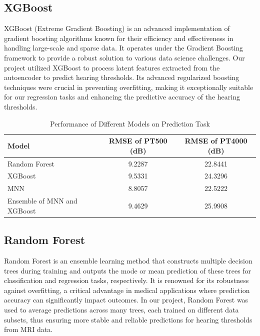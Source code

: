 \documentclass[conference,compsoc]{IEEEtran}
\begin{document}
\subsection{XGBoost} XGBoost (Extreme Gradient Boosting) is an advanced implementation of gradient boosting algorithms known for their efficiency and effectiveness in handling large-scale and sparse data. It operates under the Gradient Boosting framework to provide a robust solution to various data science challenges. Our project utilized XGBoost to process latent features extracted from the autoencoder to predict hearing thresholds. Its advanced regularized boosting techniques were crucial in preventing overfitting, making it exceptionally suitable for our regression tasks and enhancing the predictive accuracy of the hearing thresholds.

\begin{table}[ht]
	\centering
	\caption{Performance of Different Models on Prediction Task}
	\label{tab:model_performance}
	\begin{tabular}{|l|c|c|}
		\hline
		\textbf{Model}              & \textbf{RMSE of PT500 (dB)} & \textbf{RMSE of PT4000 (dB)} \\ \hline
		Random Forest               & 9.2287                      & 22.8441                      \\ \hline
		XGBoost                     & 9.5331                      & 24.3296                      \\ \hline
		MNN                         & 8.8057                      & 22.5222                      \\ \hline
		Ensemble of MNN and XGBoost & 9.4629                      & 25.9908                      \\ \hline
	\end{tabular}
        \label{table}
\end{table}

\subsection{Random Forest} Random Forest is an ensemble learning method that constructs multiple decision trees during training and outputs the mode or mean prediction of these trees for classification and regression tasks, respectively. It is renowned for its robustness against overfitting, a critical advantage in medical applications where prediction accuracy can significantly impact outcomes. In our project, Random Forest was used to average predictions across many trees, each trained on different data subsets, thus ensuring more stable and reliable predictions for hearing thresholds from MRI data.
\end{document}
